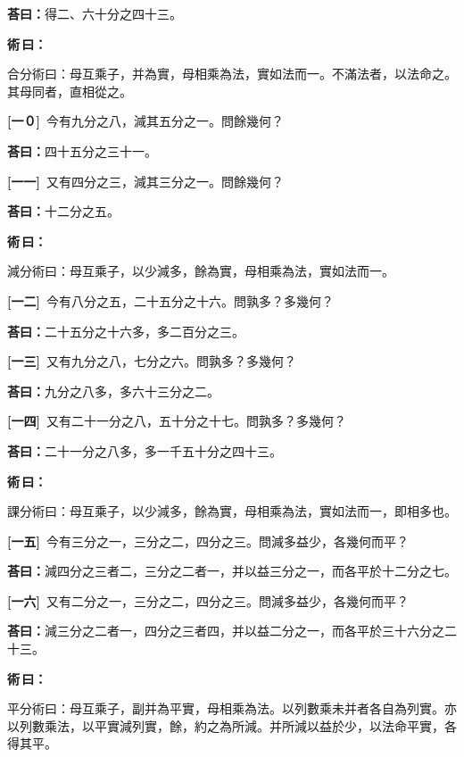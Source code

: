 \documentclass[11pt,a4paper]{article}
\newenvironment{method}{%
  \par\noindent\textcolor{methodcolor}{\textbf{術\,曰：}}%
  \ignorespaces
}{\par\vspace{0.5em}}
\newcommand{\problemnum}[1]{\textbf{[\ignorespaces#1\unskip]}}
\begin{document}
\noindent\textcolor{answercolor}{\textbf{荅曰：}}得二、六十分之四十三。

\begin{method}
合分術曰：母互乘子，并為實，母相乘為法，實如法而一。不滿法者，以法命之。其母同者，直相從之。
\end{method}

\noindent\problemnum{一０}\,
今有九分之八，減其五分之一。問餘幾何？

\noindent\textcolor{answercolor}{\textbf{荅曰：}}四十五分之三十一。

\noindent\problemnum{一一}\,
又有四分之三，減其三分之一。問餘幾何？

\noindent\textcolor{answercolor}{\textbf{荅曰：}}十二分之五。

\begin{method}
減分術曰：母互乘子，以少減多，餘為實，母相乘為法，實如法而一。
\end{method}

\noindent\problemnum{一二}\,
今有八分之五，二十五分之十六。問孰多？多幾何？

\noindent\textcolor{answercolor}{\textbf{荅曰：}}二十五分之十六多，多二百分之三。

\noindent\problemnum{一三}\,
又有九分之八，七分之六。問孰多？多幾何？

\noindent\textcolor{answercolor}{\textbf{荅曰：}}九分之八多，多六十三分之二。

\noindent\problemnum{一四}\,
又有二十一分之八，五十分之十七。問孰多？多幾何？

\noindent\textcolor{answercolor}{\textbf{荅曰：}}二十一分之八多，多一千五十分之四十三。

\begin{method}
課分術曰：母互乘子，以少減多，餘為實，母相乘為法，實如法而一，即相多也。
\end{method}

\noindent\problemnum{一五}\,
今有三分之一，三分之二，四分之三。問減多益少，各幾何而平？

\noindent\textcolor{answercolor}{\textbf{荅曰：}}減四分之三者二，三分之二者一，并以益三分之一，而各平於十二分之七。

\noindent\problemnum{一六}\,
又有二分之一，三分之二，四分之三。問減多益少，各幾何而平？

\noindent\textcolor{answercolor}{\textbf{荅曰：}}減三分之二者一，四分之三者四，并以益二分之一，而各平於三十六分之二十三。

\begin{method}
平分術曰：母互乘子，副并為平實，母相乘為法。以列數乘未并者各自為列實。亦以列數乘法，以平實減列實，餘，約之為所減。并所減以益於少，以法命平實，各得其平。
\end{method}
\end{document}

